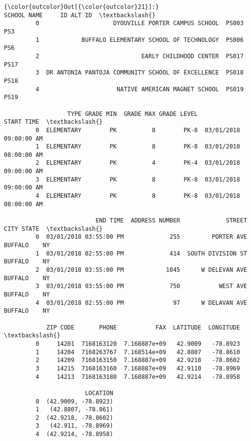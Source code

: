 \documentclass[11pt]{article}
\begin{document}
\begin{Verbatim}[commandchars=\\\{\}]
{\color{outcolor}Out[{\color{outcolor}21}]:}                                          SCHOOL NAME     ID ALT ID  \textbackslash{}
         0                     DYOUVILLE PORTER CAMPUS SCHOOL  PS003    PS3   
         1            BUFFALO ELEMENTARY SCHOOL OF TECHNOLOGY  PS006    PS6   
         2                             EARLY CHILDHOOD CENTER  PS017   PS17   
         3  DR ANTONIA PANTOJA COMMUNITY SCHOOL OF EXCELLENCE  PS018   PS18   
         4                      NATIVE AMERICAN MAGNET SCHOOL  PS019   PS19   
         
                  TYPE GRADE MIN  GRADE MAX GRADE LEVEL              START TIME  \textbackslash{}
         0  ELEMENTARY        PK          8        PK-8  03/01/2018 09:00:00 AM   
         1  ELEMENTARY        PK          8        PK-8  03/01/2018 08:00:00 AM   
         2  ELEMENTARY        PK          4        PK-4  03/01/2018 09:00:00 AM   
         3  ELEMENTARY        PK          8        PK-8  03/01/2018 09:00:00 AM   
         4  ELEMENTARY        PK          8        PK-8  03/01/2018 08:00:00 AM   
         
                          END TIME  ADDRESS NUMBER             STREET     CITY STATE  \textbackslash{}
         0  03/01/2018 03:55:00 PM             255         PORTER AVE  BUFFALO    NY   
         1  03/01/2018 02:55:00 PM             414  SOUTH DIVISION ST  BUFFALO    NY   
         2  03/01/2018 03:55:00 PM            1045      W DELEVAN AVE  BUFFALO    NY   
         3  03/01/2018 03:55:00 PM             750           WEST AVE  BUFFALO    NY   
         4  03/01/2018 02:55:00 PM              97      W DELAVAN AVE  BUFFALO    NY   
         
            ZIP CODE       PHONE           FAX  LATITUDE  LONGITUDE  \textbackslash{}
         0     14201  7168163120  7.168887e+09   42.9009   -78.8923   
         1     14204  7168263767  7.168514e+09   42.8807   -78.8610   
         2     14209  7168163150  7.168887e+09   42.9218   -78.8602   
         3     14215  7168163160  7.168887e+09   42.9110   -78.8969   
         4     14213  7168163180  7.168887e+09   42.9214   -78.8958   
         
                       LOCATION  
         0  (42.9009, -78.8923)  
         1   (42.8807, -78.861)  
         2  (42.9218, -78.8602)  
         3   (42.911, -78.8969)  
         4  (42.9214, -78.8958)  
\end{Verbatim}
            
\end{document}
